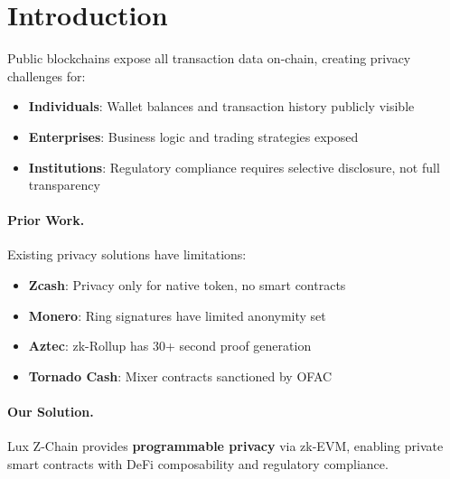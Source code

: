 \section{Introduction}

Public blockchains expose all transaction data on-chain, creating privacy challenges for:
\begin{itemize}[leftmargin=1.1em]
  \item \textbf{Individuals}: Wallet balances and transaction history publicly visible
  \item \textbf{Enterprises}: Business logic and trading strategies exposed
  \item \textbf{Institutions}: Regulatory compliance requires selective disclosure, not full transparency
\end{itemize}

\paragraph{Prior Work.} Existing privacy solutions have limitations:
\begin{itemize}[leftmargin=1.1em]
  \item \textbf{Zcash}: Privacy only for native token, no smart contracts
  \item \textbf{Monero}: Ring signatures have limited anonymity set
  \item \textbf{Aztec}: zk-Rollup has 30+ second proof generation
  \item \textbf{Tornado Cash}: Mixer contracts sanctioned by OFAC
\end{itemize}

\paragraph{Our Solution.} Lux Z-Chain provides \textbf{programmable privacy} via zk-EVM, enabling private smart contracts with DeFi composability and regulatory compliance.

